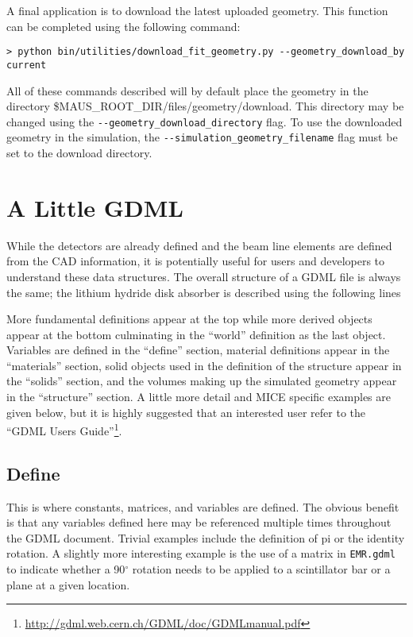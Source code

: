 A final application is to download the latest uploaded geometry. This
function can be completed using the following command:
\begin{verbatim}
> python bin/utilities/download_fit_geometry.py --geometry_download_by current
\end{verbatim}
All of these commands described will by default place the geometry in
the directory \${MAUS\_ROOT\_DIR}/files/geometry/download. This
directory may be changed using the
\verb+--geometry_download_directory+ flag. To use the downloaded
geometry in the simulation, the \verb+--simulation_geometry_filename+
flag must be set to the download directory. 

\usepackage{listings}

\section{A Little GDML}
While the detectors are already defined and the beam line elements are
defined from the CAD information, it is potentially useful for users
and developers to understand these data structures. The overall
structure of a GDML file is always the same; the lithium hydride disk
absorber is described using the following lines


More fundamental definitions appear at the top while more derived
objects appear at the bottom culminating in the ``world'' definition
as the last object. Variables are defined in the ``define'' section,
material definitions appear in the ``materials'' section, solid
objects used in the definition of the structure appear in the
``solids'' section, and the volumes making up the simulated geometry
appear in the ``structure'' section.  A little more detail and MICE
specific examples are given below, but it is highly suggested that an
interested user refer to the ``GDML Users
Guide''\footnote{\url{http://gdml.web.cern.ch/GDML/doc/GDMLmanual.pdf}}.

\subsection{Define}
This is where constants, matrices, and variables are defined. The
obvious benefit is that any variables defined here may be referenced
multiple times throughout the GDML document. Trivial examples include
the definition of pi or the identity rotation. A slightly more
interesting example is the use of a matrix in \verb+EMR.gdml+ to
indicate whether a 90$^{\circ}$ rotation needs to be applied to a
scintillator bar or a plane at a given location.

